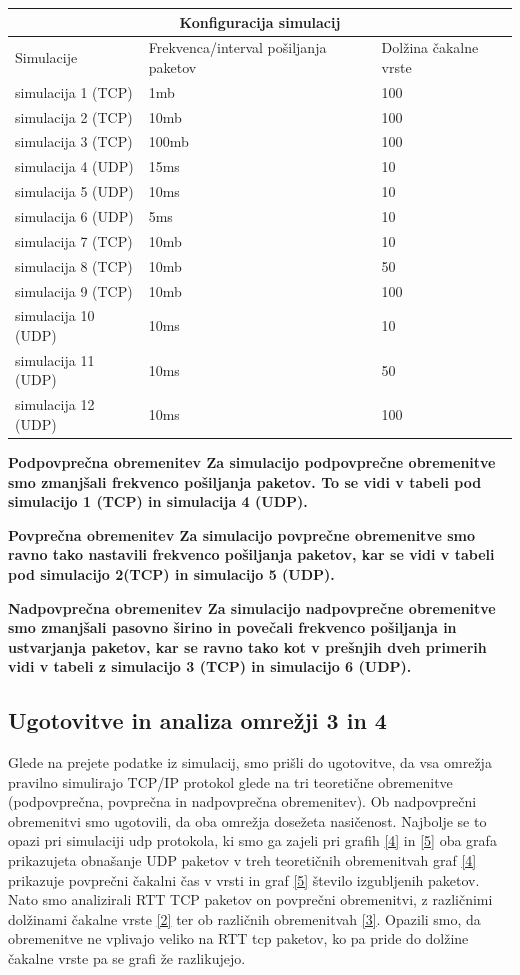 \documentclass[11pt, a4paper, slovene]{book}
\begin{document}
\begin{tabular}{|p{3cm}||p{3cm}|p{3cm}|}
	\hline
	\multicolumn{3}{|c|}{Konfiguracija simulacij} \\
	\hline
	Simulacije& Frekvenca/interval pošiljanja paketov& Dolžina čakalne vrste \\
	\hline 
	simulacija 1 (TCP)& 1mb & 100\\
	simulacija 2 (TCP)& 10mb & 100\\
	simulacija 3 (TCP)& 100mb & 100\\
	simulacija 4 (UDP)& 15ms & 10\\
	simulacija 5 (UDP)& 10ms & 10\\
	simulacija 6 (UDP)& 5ms & 10\\
	simulacija 7 (TCP)& 10mb &	10\\
	simulacija 8 (TCP)& 10mb & 50\\
	simulacija 9 (TCP)& 10mb & 100\\
	simulacija 10 (UDP)& 10ms & 10\\
	simulacija 11 (UDP)& 10ms & 50\\
	simulacija 12 (UDP)& 10ms & 100\\
	\hline
\end{tabular} 

\large \bf Podpovprečna obremenitev 
\normalfont \normalsize
Za simulacijo podpovprečne obremenitve smo zmanjšali frekvenco pošiljanja paketov. To se vidi v tabeli pod
simulacijo 1 (TCP) in simulacija 4 (UDP). 

\large \bf Povprečna obremenitev 
\normalfont \normalsize
Za simulacijo povprečne obremenitve smo ravno tako nastavili frekvenco pošiljanja paketov, kar se vidi v tabeli pod simulacijo 2(TCP) in simulacijo 5 (UDP). 

\large \bf Nadpovprečna obremenitev 
\normalfont \normalsize
Za simulacijo nadpovprečne obremenitve smo zmanjšali pasovno širino in povečali frekvenco pošiljanja in ustvarjanja paketov, kar se ravno tako kot v prešnjih dveh primerih vidi v tabeli z simulacijo 3 (TCP) in simulacijo 6 (UDP).

\subsection{Ugotovitve in analiza omrežji 3 in 4}
Glede na prejete podatke iz simulacij, smo prišli do ugotovitve, da vsa omrežja pravilno simulirajo TCP/IP protokol glede na tri teoretične obremenitve (podpovprečna, povprečna in nadpovprečna obremenitev). 
Ob nadpovprečni obremenitvi smo ugotovili, da oba omrežja dosežeta nasičenost. Najbolje se to opazi pri simulaciji udp protokola, ki smo ga zajeli pri grafih \ref{4} in \ref{5} oba grafa prikazujeta obnašanje UDP paketov v treh teoretičnih obremenitvah graf \ref{4} prikazuje povprečni čakalni čas v vrsti in graf \ref{5} število izgubljenih paketov. Nato smo analizirali RTT TCP paketov on povprečni obremenitvi, z različnimi dolžinami čakalne vrste \ref{2} ter ob različnih obremenitvah \ref{3}. Opazili smo, da obremenitve ne vplivajo veliko na RTT tcp paketov, ko pa pride do dolžine čakalne vrste pa se grafi že razlikujejo.
\end{document}
